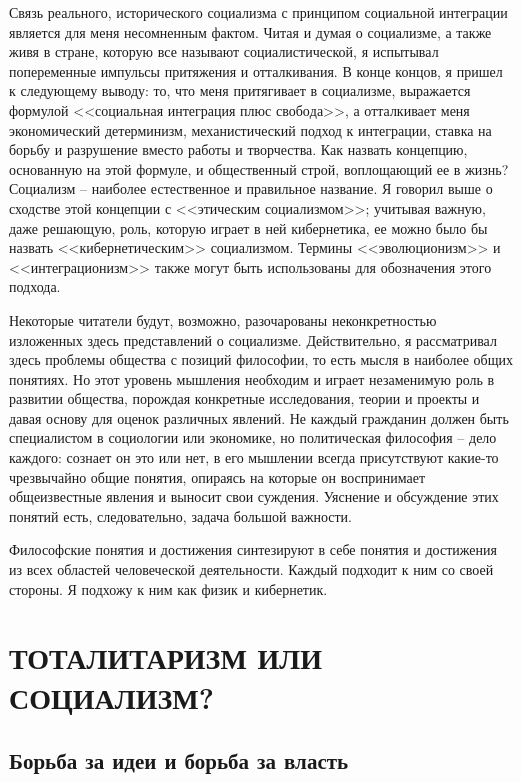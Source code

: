 \documentclass{book}
\begin{document}
Связь реального, исторического социализма с принципом социальной интеграции является для меня несомненным фактом. Читая и думая о социализме, а также живя в стране, которую все называют социалистической, я испытывал попеременные импульсы притяжения и отталкивания. В конце концов, я при­шел к следующему выводу: то, что меня притягивает в социализ­ме, выражается формулой <<социальная интеграция плюс свобо­да>>, а отталкивает меня экономический детерминизм, механи­стический подход к интеграции, ставка на борьбу и разрушение вместо работы и творчества. Как назвать концепцию, основан­ную на этой формуле, и общественный строй, воплощающий ее в жизнь? Социализм -- наиболее естественное и правильное на­звание. Я говорил выше о сходстве этой концепции с <<этическим социализмом>>; учитывая важную, даже решающую, роль, которую играет в ней кибернетика, ее можно было бы назвать <<кибер­нетическим>> социализмом. Термины <<эволюционизм>> и <<интеграционизм>> также могут быть использованы для обозначения этого подхода.

Некоторые читатели будут, возможно, разочарованы неконк­ретностью изложенных здесь представлений о социализме. Дейст­вительно, я рассматривал здесь проблемы общества с позиций философии, то есть мысля в наиболее общих понятиях. Но этот уровень мышления необходим и играет незаменимую роль в раз­витии общества, порождая конкретные исследования, теории и проекты и давая основу для оценок различных явлений. Не каж­дый гражданин должен быть специалистом в социологии или экономике, но политическая философия -- дело каждого: со­знает он это или нет, в его мышлении всегда присутствуют какие-то чрезвычайно общие понятия, опираясь на которые он воспри­нимает общеизвестные явления и выносит свои суждения. Уяс­нение и обсуждение этих понятий есть, следовательно, задача большой важности.

Философские понятия и достижения синтезируют в себе поня­тия и достижения из всех областей человеческой деятельности. Каждый подходит к ним со своей стороны. Я подхожу к ним как физик и кибернетик.



\chapter{ТОТАЛИТАРИЗМ ИЛИ СОЦИАЛИЗМ?}

\section{Борьба за идеи и борьба за власть}
\end{document}
